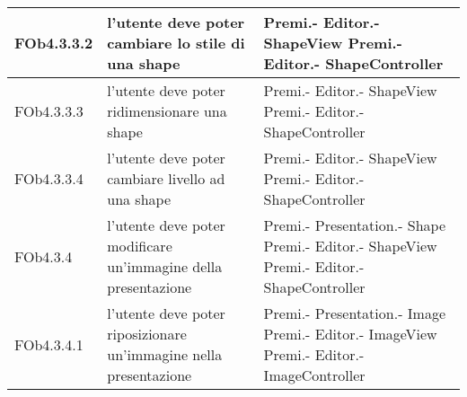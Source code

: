 \begin{longtable}{|l|p{5cm}|p{4cm}|}
\hline
FOb4.3.3.2 & l'utente deve poter cambiare lo stile di una shape & Premi.- \linebreak Editor.- \linebreak ShapeView \linebreak Premi.- \linebreak Editor.- \linebreak ShapeController \linebreak \\
\hline
FOb4.3.3.3 & l'utente deve poter ridimensionare una shape & Premi.- \linebreak Editor.- \linebreak ShapeView \linebreak Premi.- \linebreak Editor.- \linebreak ShapeController \linebreak \\
\hline
FOb4.3.3.4 & l'utente deve poter cambiare livello ad una shape & Premi.- \linebreak Editor.- \linebreak ShapeView \linebreak Premi.- \linebreak Editor.- \linebreak ShapeController \linebreak \\
\hline
FOb4.3.4 & l'utente deve poter modificare un'immagine della presentazione & Premi.- \linebreak Presentation.- \linebreak Shape \linebreak Premi.- \linebreak Editor.- \linebreak ShapeView \linebreak Premi.- \linebreak Editor.- \linebreak ShapeController \linebreak \\
\hline
FOb4.3.4.1 & l'utente deve poter riposizionare un'immagine nella presentazione & Premi.- \linebreak Presentation.- \linebreak Image \linebreak Premi.- \linebreak Editor.- \linebreak ImageView \linebreak Premi.- \linebreak Editor.- \linebreak ImageController \linebreak \\

\end{longtable}
